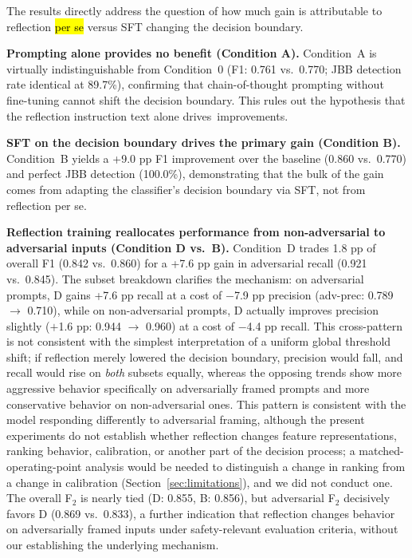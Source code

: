 \documentclass[superintelligence,article,accept,moreauthors]{Definitions/mdpi}
\begin{document}
\vspace{-5pt}

The results directly address the question of how much gain is attributable to reflection \hl{per se} %
 versus SFT changing the decision boundary.

\textbf{Prompting alone provides no benefit (Condition A).}
Condition~A is virtually indistinguishable from Condition~0 (F1: 0.761 vs.\ 0.770; JBB detection rate identical at 89.7\%), confirming that chain-of-thought prompting without fine-tuning cannot shift the decision boundary. This rules out the hypothesis that the reflection instruction text alone \mbox{drives improvements.}

\textbf{SFT on the decision boundary drives the primary gain (Condition B).}
Condition~B yields a +9.0 pp F1 improvement over the baseline (0.860 vs.\ 0.770) and perfect JBB detection (100.0\%), demonstrating that the bulk of the gain comes from adapting the classifier's decision boundary via SFT, not from reflection per se.

\textbf{Reflection training reallocates performance from non-adversarial to adversarial inputs (Condition D vs.\ B).}
Condition~D trades 1.8 pp of overall F1 (0.842 vs.\ 0.860) for a +7.6 pp gain in adversarial recall (0.921 vs.\ 0.845). The subset breakdown clarifies the mechanism: on adversarial prompts, D gains +7.6 pp recall at a cost of $-$7.9 pp precision (adv-prec: 0.789 $\to$ 0.710), while on non-adversarial prompts, D actually improves precision slightly ($+$1.6 pp: 0.944 $\to$ 0.960) at a cost of $-$4.4 pp recall. This cross-pattern is not consistent with the simplest interpretation of a uniform global threshold shift; if reflection merely lowered the decision boundary, precision would fall, and recall would rise on \emph{both} subsets equally, whereas the opposing trends show more aggressive behavior specifically on adversarially framed prompts and more conservative behavior on non-adversarial ones. This pattern is consistent with the model responding differently to adversarial framing, although the present experiments do not establish whether reflection changes feature representations, ranking behavior, calibration, or another part of the decision process; a matched-operating-point analysis would be needed to distinguish a change in ranking from a change in calibration (Section~\ref{sec:limitations}), and we did not conduct one. The overall F$_2$ is nearly tied (D: 0.855, B: 0.856), but adversarial F$_2$ decisively favors D (0.869 vs.\ 0.833), a further indication that reflection changes behavior on adversarially framed inputs under safety-relevant evaluation criteria, without our establishing the underlying mechanism.
\end{document}
